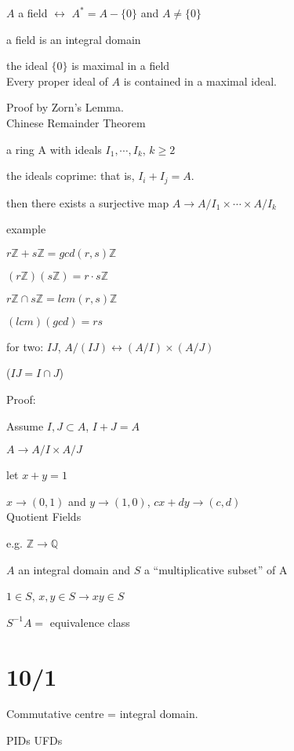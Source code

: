 \documentclass[12pt]{article}
\newcommand{\inv}{^{-1}}
\begin{document}
\noindent
$A$ a field $\leftrightarrow$ $A^* = A - \{0\}$ and $A \neq \{0\}$

a field is an integral domain

the ideal $\{0\}$ is maximal in a field\\

\noindent
Every proper ideal of $A$ is contained in a maximal ideal.

Proof by Zorn's Lemma.\\

\noindent
Chinese Remainder Theorem

a ring A with ideals $I_1, \cdots, I_k$, $k \geq 2$

the ideals coprime: that is, $I_i + I_j = A$.

then there exists a surjective map $A \to A/I_1 \times \cdots \times A/I_k$

\noindent
example

$r\mathds{Z} + s\mathds{Z} = gcd(r, s)\mathds{Z}$

$(r\mathds{Z})(s\mathds{Z}) = r\cdot s\mathds{Z}$

$r\mathds{Z} \cap s\mathds{Z} = lcm(r, s)\mathds{Z}$

$(lcm)(gcd) = rs$

\noindent
for two: $IJ$, $A/(IJ) \leftrightarrow (A/I) \times (A/J)$

($IJ = I \cap J$)

\noindent
Proof:

Assume $I, J \subset A$, $I + J = A$

$A \to A/I \times A/J$

let $x + y = 1$

$x \to (0, 1)$ and $y \to (1, 0)$, $cx + dy \to (c, d)$\\

\noindent
Quotient Fields

e.g. $\mathds{Z} \to \mathds{Q}$

$A$ an integral domain and $S$ a ``multiplicative subset'' of A

$1 \in S$, $x, y \in S \to xy \in S$

$S\inv A = $ equivalence class

\section{10/1}

Commutative centre = integral domain.

\noindent
PIDs UFDs
\end{document}
